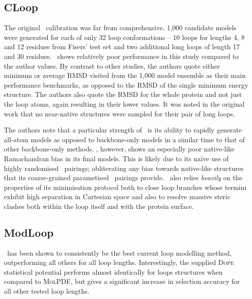 \subsection{CLoop}

The original \cloop\ calibration was far from comprehensive. 1,000 candidate models were generated for each of only 32 loop conformations -- 10 loops for lengths 4, 8 and 12 residues from Fisers' test set\cite{METHOD:Fis2000} and two additional long loops of length 17 and 30 residues. \cloop\ shows relatively poor performance in this study compared to the author values. By contrast to other studies, the authors quote either minimum or average RMSD visited from the 1,000 model ensemble as their main performance benchmarks, as opposed to the RMSD of the single minimum energy structure. The authors also quote the RMSD for the whole protein and not just the loop atoms, again resulting in their lower values. It was noted in the original work that no near-native structures were sampled for their pair of long loops.

The authors note that a particular strength of \cloop\ is its ability to rapidly generate all-atom models as opposed to backbone-only models in a similar time to that of other backbone-only methods. \cloop, however, shows an especially poor native-like Ramachandran bias in its final models. This is likely due to its na\"ive use of highly randomised \phipsi\ pairings; obliterating any bias towards native-like structures that its coarse-grained parametised \phipsi\ pairings provide. \cloop\ also relies \emph{heavily} on the properties of its minimisation protocol both to close loop branches whose termini exhibit high separation in Cartesian space and also to resolve massive steric clashes both within the loop itself and with the protein surface.


\subsection{ModLoop}

\modloop\ has been shown to consistently be the best current loop modelling method, outperforming all others for all loop lengths. Interestingly, the supplied \textsc{Dope} statistical potential performs almost identically for  loops structures when compared to \textsc{MolPDF}, but gives a significant increase in selection accuracy for all other tested loop lengths.


